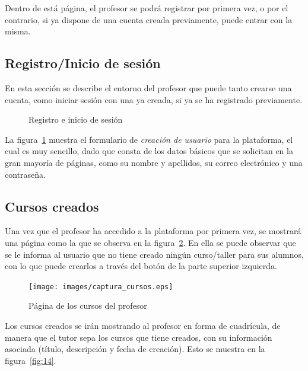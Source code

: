 Dentro de está página, el profesor se podrá registrar por primera vez, o por el contrario, si ya dispone de una cuenta creada previamente, puede entrar con la misma.


\subsection{Registro/Inicio de sesión}
\label{1:sec:2}

En esta sección se describe el entorno del profesor que puede tanto crearse una cuenta, como iniciar sesión con una ya creada, si ya se ha registrado previamente. 

\begin{figure}[!th]%
    \centering
    \qquad
    \caption{Registro e inicio de sesión}%
    \label{fig:12}%
\end{figure}

La figura~\ref{fig:12} muestra el formulario de \textit{creación de usuario} para la plataforma, el cual es muy sencillo, dado que consta de los datos básicos que se solicitan en la gran mayoría de páginas, como su nombre y apellidos, su correo electrónico y una contraseña.


\subsection{Cursos creados}
\label{1:sec:3}

Una vez que el profesor ha accedido a la plataforma por primera vez, se mostrará una página como la que se observa en la figura~\ref{fig:13}. En ella se puede observar que se le informa al usuario que no tiene creado ningún curso/taller para sus alumnos, 
con lo que puede crearlos a través del botón de la parte superior izquierda.

\newpage
\begin{figure}[!th]
\begin{center}
\texttt{[image: images/captura\_cursos.eps]}
\caption{Página de los cursos del profesor}
\label{fig:13}
\end{center}
\end{figure}

Los cursos creados se irán mostrando al profesor en forma de cuadrícula, de manera que el tutor sepa los cursos que tiene creados, con su información asociada (título, descripción y fecha de creación). Esto se muestra en la figura~\ref{fig:14}.

